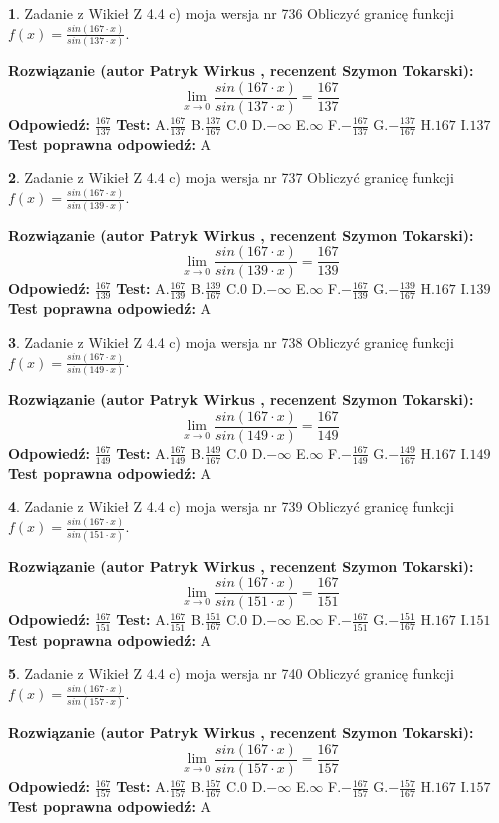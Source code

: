 \documentclass[12pt, a4paper]{article}
\theoremstyle{definition} %
\newtheorem{zad}{}
\newcommand{\zadStart}[1]{\begin{zad}#1\newline}
\newcommand{\zadStop}{\end{zad}}
\newcommand{\rozwStart}[2]{\noindent \textbf{Rozwiązanie (autor #1 , recenzent #2): }\newline}
\newcommand{\rozwStop}{\newline}
\newcommand{\odpStart}{\noindent \textbf{Odpowiedź:}\newline}
\newcommand{\odpStop}{\newline}
\newcommand{\testStart}{\noindent \textbf{Test:}\newline}
\newcommand{\testStop}{\newline}
\newcommand{\kluczStart}{\noindent \textbf{Test poprawna odpowiedź:}\newline}
\newcommand{\kluczStop}{\newline}
\begin{document}
\zadStart{Zadanie z Wikieł Z 4.4 c) moja wersja nr 736}
Obliczyć granicę funkcji $f(x)=\frac{sin(167\cdot x)}{sin(137\cdot x)}$.
\zadStop
\rozwStart{Patryk Wirkus}{Szymon Tokarski}
$$\lim\limits_{x\to 0}\frac{sin(167\cdot x)}{sin(137\cdot x)}=
\frac{167}{137}$$
\rozwStop
\odpStart
$\frac{167}{137}$
\odpStop
\testStart
A.$\frac{167}{137}$
B.$\frac{137}{167}$
C.$0$
D.$-\infty$
E.$\infty$
F.$-\frac{167}{137}$
G.$-\frac{137}{167}$
H.$167$
I.$137$
\testStop
\kluczStart
A
\kluczStop



\zadStart{Zadanie z Wikieł Z 4.4 c) moja wersja nr 737}
Obliczyć granicę funkcji $f(x)=\frac{sin(167\cdot x)}{sin(139\cdot x)}$.
\zadStop
\rozwStart{Patryk Wirkus}{Szymon Tokarski}
$$\lim\limits_{x\to 0}\frac{sin(167\cdot x)}{sin(139\cdot x)}=
\frac{167}{139}$$
\rozwStop
\odpStart
$\frac{167}{139}$
\odpStop
\testStart
A.$\frac{167}{139}$
B.$\frac{139}{167}$
C.$0$
D.$-\infty$
E.$\infty$
F.$-\frac{167}{139}$
G.$-\frac{139}{167}$
H.$167$
I.$139$
\testStop
\kluczStart
A
\kluczStop



\zadStart{Zadanie z Wikieł Z 4.4 c) moja wersja nr 738}
Obliczyć granicę funkcji $f(x)=\frac{sin(167\cdot x)}{sin(149\cdot x)}$.
\zadStop
\rozwStart{Patryk Wirkus}{Szymon Tokarski}
$$\lim\limits_{x\to 0}\frac{sin(167\cdot x)}{sin(149\cdot x)}=
\frac{167}{149}$$
\rozwStop
\odpStart
$\frac{167}{149}$
\odpStop
\testStart
A.$\frac{167}{149}$
B.$\frac{149}{167}$
C.$0$
D.$-\infty$
E.$\infty$
F.$-\frac{167}{149}$
G.$-\frac{149}{167}$
H.$167$
I.$149$
\testStop
\kluczStart
A
\kluczStop



\zadStart{Zadanie z Wikieł Z 4.4 c) moja wersja nr 739}
Obliczyć granicę funkcji $f(x)=\frac{sin(167\cdot x)}{sin(151\cdot x)}$.
\zadStop
\rozwStart{Patryk Wirkus}{Szymon Tokarski}
$$\lim\limits_{x\to 0}\frac{sin(167\cdot x)}{sin(151\cdot x)}=
\frac{167}{151}$$
\rozwStop
\odpStart
$\frac{167}{151}$
\odpStop
\testStart
A.$\frac{167}{151}$
B.$\frac{151}{167}$
C.$0$
D.$-\infty$
E.$\infty$
F.$-\frac{167}{151}$
G.$-\frac{151}{167}$
H.$167$
I.$151$
\testStop
\kluczStart
A
\kluczStop



\zadStart{Zadanie z Wikieł Z 4.4 c) moja wersja nr 740}
Obliczyć granicę funkcji $f(x)=\frac{sin(167\cdot x)}{sin(157\cdot x)}$.
\zadStop
\rozwStart{Patryk Wirkus}{Szymon Tokarski}
$$\lim\limits_{x\to 0}\frac{sin(167\cdot x)}{sin(157\cdot x)}=
\frac{167}{157}$$
\rozwStop
\odpStart
$\frac{167}{157}$
\odpStop
\testStart
A.$\frac{167}{157}$
B.$\frac{157}{167}$
C.$0$
D.$-\infty$
E.$\infty$
F.$-\frac{167}{157}$
G.$-\frac{157}{167}$
H.$167$
I.$157$
\testStop
\kluczStart
A
\kluczStop
\end{document}
